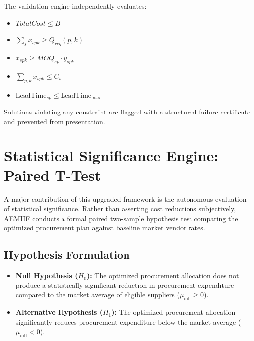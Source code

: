 \documentclass[conference]{IEEEtran}
\begin{document}
The validation engine independently evaluates:
\begin{itemize}
    \item $TotalCost \le B$
    \item $\sum_s x_{spk} \ge Q_{req}(p, k)$
    \item $x_{spk} \ge MOQ_{sp} \cdot y_{spk}$
    \item $\sum_{p,k} x_{spk} \le C_s$
    \item $\text{LeadTime}_{sp} \le \text{LeadTime}_{\max}$
\end{itemize}
Solutions violating any constraint are flagged with a structured failure certificate and prevented from presentation.

\section{Statistical Significance Engine: Paired T-Test}
A major contribution of this upgraded framework is the autonomous evaluation of statistical significance. Rather than asserting cost reductions subjectively, AEMIIF conducts a formal paired two-sample hypothesis test comparing the optimized procurement plan against baseline market vendor rates.

\subsection{Hypothesis Formulation}
\begin{itemize}
    \item \textbf{Null Hypothesis ($H_0$):} The optimized procurement allocation does not produce a statistically significant reduction in procurement expenditure compared to the market average of eligible suppliers ($\mu_{\text{diff}} \ge 0$).
    \item \textbf{Alternative Hypothesis ($H_1$):} The optimized procurement allocation significantly reduces procurement expenditure below the market average ($\mu_{\text{diff}} < 0$).
\end{itemize}
\end{document}
